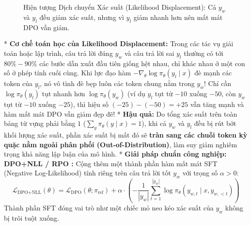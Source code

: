 \begin{figure}[h!]
\centering
{}
\caption{Hiện tượng Dịch chuyển Xác suất (Likelihood Displacement): Cả $y_w$ và $y_l$ đều giảm xác suất, nhưng vì $y_l$ giảm nhanh hơn nên mất mát DPO vẫn giảm.}
\label{fig:likelihood_displacement}
\end{figure}

* \textbf{Cơ chế toán học của Likelihood Displacement:}
Trong các tác vụ giải toán hoặc lập trình, câu trả lời đúng $y_w$ và câu trả lời sai $y_l$ thường có tới $80\% - 90\%$ các bước dẫn xuất đầu tiên giống hệt nhau, chỉ khác nhau ở một con số ở phép tính cuối cùng. Khi lực đạo hàm $-\nabla_\theta \log \pi_\theta(y_l \mid x)$ đè mạnh các token của $y_l$, nó vô tình đè bẹp luôn các token chung nằm trong $y_w$!
Chỉ cần $\log \pi_\theta(y_l)$ tụt nhanh hơn $\log \pi_\theta(y_w)$ (ví dụ $y_l$ tụt từ $-10$ xuống $-50$, còn $y_w$ tụt từ $-10$ xuống $-25$), thì hiệu số $(-25) - (-50) = +25$ vẫn tăng mạnh và hàm mất mát DPO vẫn giảm đẹp đẽ!
* \textbf{Hậu quả:} Do tổng xác suất trên toàn bảng từ vựng phải bằng $1$ ($\sum_{y} \pi_\theta(y \mid x) = 1$), khi cả $y_w$ và $y_l$ đều bị rút bớt khối lượng xác suất, phần xác suất bị mất đó sẽ \textbf{tràn sang các chuỗi token kỳ quặc nằm ngoài phân phối (Out-of-Distribution)}, làm suy giảm nghiêm trọng khả năng lập luận của mô hình.
* \textbf{Giải pháp chuẩn công nghiệp: DPO+NLL / RPO \citep{pang2024iterative, dubey2024llama, lambert2024tulu}:}
Cộng thêm một thành phần hàm mất mát SFT (Negative Log-Likelihood) tính riêng trên câu trả lời tốt $y_w$ với trọng số $\alpha > 0$:
\begin{equation}
    \boxed{\mathcal{L}_{\text{DPO+NLL}}(\theta) = \mathcal{L}_{\text{DPO}}(\theta; \pi_{\text{ref}}) + \alpha \cdot \left( -\frac{1}{|y_w|} \sum_{t=1}^{|y_w|} \log \pi_\theta(y_{w, t} \mid x, y_{w, <t}) \right)}
    \label{eq:rpo_loss}
\end{equation}
Thành phần SFT đóng vai trò như một chiếc mỏ neo kéo xác suất của $y_w$ không bị trôi tuột xuống.

